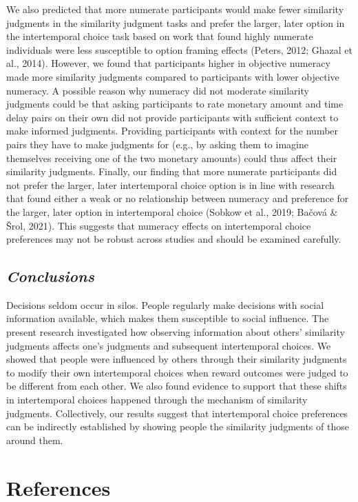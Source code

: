 \documentclass[
  pub,floatsintext]{apa6}
\begin{document}
We also predicted that more numerate participants would make fewer similarity judgments in the similarity judgment tasks and prefer the larger, later option in the intertemporal choice task based on work that found highly numerate individuals were less susceptible to option framing effects (Peters, 2012; Ghazal et al., 2014). However, we found that participants higher in objective numeracy made more similarity judgments compared to participants with lower objective numeracy. A possible reason why numeracy did not moderate similarity judgments could be that asking participants to rate monetary amount and time delay pairs on their own did not provide participants with sufficient context to make informed judgments. Providing participants with context for the number pairs they have to make judgments for (e.g., by asking them to imagine themselves receiving one of the two monetary amounts) could thus affect their similarity judgments. Finally, our finding that more numerate participants did not prefer the larger, later intertemporal choice option is in line with research that found either a weak or no relationship between numeracy and preference for the larger, later option in intertemporal choice (Sobkow et al., 2019; Bačová \& Šrol, 2021). This suggests that numeracy effects on intertemporal choice preferences may not be robust across studies and should be examined carefully.

\hypertarget{conclusions}{%
\subsection{\texorpdfstring{\emph{Conclusions}}{Conclusions}}\label{conclusions}}

Decisions seldom occur in silos. People regularly make decisions with social information available, which makes them susceptible to social influence. The present research investigated how observing information about others' similarity judgments affects one's judgments and subsequent intertemporal choices. We showed that people were influenced by others through their similarity judgments to modify their own intertemporal choices when reward outcomes were judged to be different from each other. We also found evidence to support that these shifts in intertemporal choices happened through the mechanism of similarity judgments. Collectively, our results suggest that intertemporal choice preferences can be indirectly established by showing people the similarity judgments of those around them.

\hypertarget{references}{%
\section{References}\label{references}}
\end{document}
